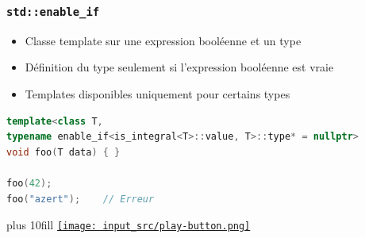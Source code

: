 \documentclass[C++.tex]{subfiles}
\begin{document}
\begin{frame}[fragile]
	\frametitle{\lstinline|std::enable_if|}
	\begin{itemize}
		\item Classe template sur une expression booléenne et un type
		\item Définition du type seulement si l'expression booléenne est vraie
		\item Templates disponibles uniquement pour certains types
	\end{itemize}

	\begin{lstlisting}[language=C++]
template<class T, 
typename enable_if<is_integral<T>::value, T>::type* = nullptr>
void foo(T data) { }

foo(42);
foo("azert");    // Erreur\end{lstlisting}

	\vskip 10mm plus 10fill
	\hfill
	\href{https://godbolt.org/#g:!((g:!((g:!((h:codeEditor,i:(filename:'1',fontScale:14,fontUsePx:'0',j:1,lang:c%2B%2B,selection:(endColumn:6,endLineNumber:22,positionColumn:6,positionLineNumber:22,selectionStartColumn:6,selectionStartLineNumber:22,startColumn:6,startLineNumber:22),source:'%23include+%3Ciostream%3E%0A%23include+%3Ctype_traits%3E%0A%0Atemplate%3Cclass+T,+typename+std::enable_if%3Cstd::is_integral%3CT%3E::value,+T%3E::type*+%3D+nullptr%3E%0Avoid+foo(T+data)+%7B+%7D%0A%0Atemplate%3Cclass+T,+typename+std::enable_if%3C!!std::is_integral%3CT%3E::value,+T%3E::type*+%3D+nullptr%3E%0Avoid+bar(T)%0A%7B%0A++std::cout+%3C%3C+%22Generique%5Cn%22%3B%0A%7D%0A%0Atemplate%3Cclass+T,typename+std::enable_if%3Cstd::is_integral%3CT%3E::value,+T%3E::type*+%3D+nullptr%3E%0Avoid+bar(T)%0A%7B%0A++std::cout+%3C%3C+%22Entier%5Cn%22%3B%0A%7D%0A%0Aint+main()%0A%7B%0A++foo(42)%3B%0A%23if+1%0A++foo(%22azert%22)%3B%0A%23endif%0A%0A++bar(42)%3B%0A++bar(%22azert%22)%3B%0A%7D%0A'),l:'5',n:'0',o:'C%2B%2B+source+%231',t:'0')),k:50,l:'4',n:'0',o:'',s:0,t:'0'),(g:!((h:executor,i:(argsPanelShown:'1',compilationPanelShown:'0',compiler:g112,compilerOutShown:'0',execArgs:'',execStdin:'',fontScale:14,fontUsePx:'0',j:1,lang:c%2B%2B,libs:!((name:boost,ver:'175')),options:'-std%3Dc%2B%2B11',source:1,stdinPanelShown:'1',tree:'1',wrap:'0'),l:'5',n:'0',o:'Executor+x86-64+gcc+11.2+(C%2B%2B,+Editor+%231)',t:'0')),header:(),k:50,l:'4',n:'0',o:'',s:0,t:'0')),l:'2',n:'0',o:'',t:'0')),version:4}{\texttt{[image: input\_src/play-button.png]}}
\end{frame}
\end{document}
